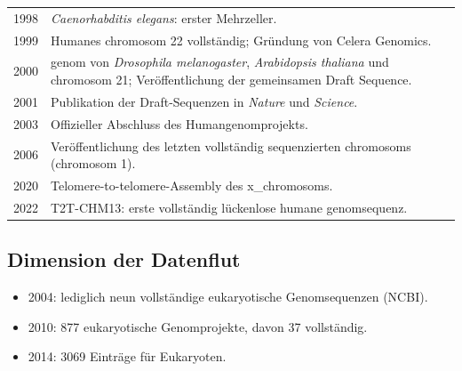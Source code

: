 \begin{mytable}
\begin{tabular}{|p{2cm}|p{12cm}|}
        1998          & \textit{Caenorhabditis elegans}: erster Mehrzeller.                                                                                                      \\
        1999          & Humanes \gls{chromosom} 22 vollständig; Gründung von Celera Genomics.                                                                                    \\
        2000          & \gls{genom} von \textit{Drosophila melanogaster}, \textit{Arabidopsis thaliana} und \gls{chromosom} 21; Veröffentlichung der gemeinsamen Draft Sequence. \\
        2001          & Publikation der Draft-Sequenzen in \textit{Nature} und \textit{Science}.                                                                                 \\
        2003          & Offizieller Abschluss des Humangenomprojekts.                                                                                                            \\
        2006          & Veröffentlichung des letzten vollständig sequenzierten \gls{chromosom}s (\gls{chromosom} 1).                                                             \\
        2020          & Telomere-to-telomere-Assembly des \gls{x_chromosom}s.                                                                                                    \\
        2022          & T2T-CHM13: erste vollständig lückenlose humane \gls{genom}sequenz.                                                                                       \\
        \hline
    \end{tabular}
\end{mytable}

\subsection*{Dimension der Datenflut}\label{subsec:dimension-der-datenflut}

\begin{itemize}
    \item 2004: lediglich neun vollständige eukaryotische Genomsequenzen (NCBI).
    \item 2010: 877 eukaryotische Genomprojekte, davon 37 vollständig.
    \item 2014: 3069 Einträge für Eukaryoten.
\end{itemize}

